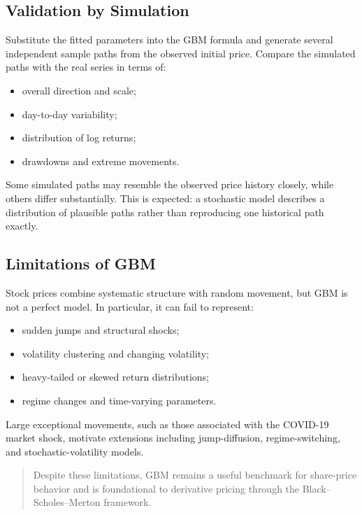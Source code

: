 \documentclass[12pt,openany]{book}
\theoremstyle{definition}
\theoremstyle{remark}
\begin{document}
\subsection{Validation by Simulation}

Substitute the fitted parameters into the GBM formula and generate several
independent sample paths from the observed initial price. Compare the
simulated paths with the real series in terms of:
\begin{itemize}
    \item overall direction and scale;
    \item day-to-day variability;
    \item distribution of log returns;
    \item drawdowns and extreme movements.
\end{itemize}

Some simulated paths may resemble the observed price history closely, while
others differ substantially. This is expected: a stochastic model describes
a distribution of plausible paths rather than reproducing one historical
path exactly.

\subsection{Limitations of GBM}

Stock prices combine systematic structure with random movement, but GBM is
not a perfect model. In particular, it can fail to represent:
\begin{itemize}
    \item sudden jumps and structural shocks;
    \item volatility clustering and changing volatility;
    \item heavy-tailed or skewed return distributions;
    \item regime changes and time-varying parameters.
\end{itemize}

Large exceptional movements, such as those associated with the COVID-19
market shock, motivate extensions including jump-diffusion,
regime-switching, and stochastic-volatility models.

\begin{quote}
Despite these limitations, GBM remains a useful benchmark for share-price
behavior and is foundational to derivative pricing through the
Black--Scholes--Merton framework.
\end{quote}
\end{document}
